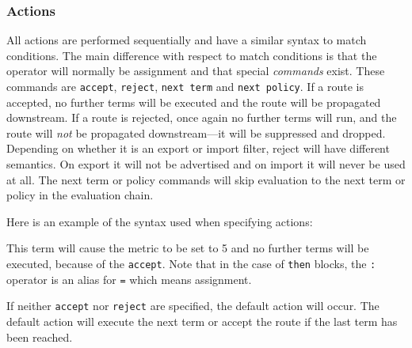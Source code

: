 \subsubsection{Actions}
All actions are performed sequentially and have a similar syntax to match
conditions. The main difference with respect to match conditions is that the
operator will normally be assignment and that special {\em commands} exist.
These commands are {\tt accept}, {\tt reject}, {\tt next term} and {\tt next
policy}.  If a route is accepted, no
further terms will be executed and the route will be propagated downstream.  If
a route is rejected, once again no further terms will run, and the route will {\em
not} be propagated downstream---it will be suppressed and dropped.  Depending on
whether it is an export or import filter, reject will have different semantics.
On export it will not be advertised and on import it will never be used at all.
The next term or policy commands will skip evaluation to the next term or policy
in the evaluation chain.

Here is an example of the syntax used when specifying actions:

\noindent{}

This term will cause the metric to be set to 5 and no further terms will be
executed, because of the {\tt accept}. Note that in the case of {\tt then}
blocks, the {\tt :} operator is an alias for {\tt =} which means assignment.

If neither {\tt accept} nor {\tt reject} are specified, the default action will
occur.  The default action will execute the next term or accept the route if the
last term has been reached.

